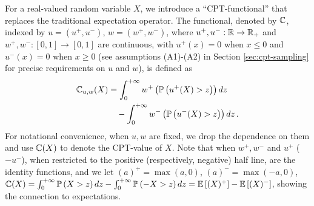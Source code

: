 
For a real-valued random variable $X$, we introduce a ``CPT-functional'' that replaces the traditional expectation operator. 
The functional, denoted by $\mathbb{C}$,
indexed by
$u=(u^+,u^-)$, $w=(w^+,w^-)$, where $u^+,u^-:\mathbb{R}\rightarrow \mathbb{R}_+$ and $w^+,w^-:[0,1] \rightarrow [0,1]$ are continuous,
with $u^+(x)=0$ when $x\le 0$ and $u^-(x)=0$ when $x\ge 0$ (see assumptions (A1)-(A2) in Section \ref{sec:cpt-sampling} for precise requirements on $u$ and $w$),
 is defined as 
\begin{align}
\mathbb{C}_{u,w}(X) &= \int_0^{+\infty} w^+\left(\mathbb{P}\left( u^+(X)>z \right)\right) dz\nonumber \\
&\quad - \int_0^{+\infty} w^-\left(\mathbb{P}\left( u^-(X)>z \right)\right) dz\,. \label{eq:cpt-general}
\end{align}
For notational convenience, when $u,w$ are fixed, we drop the dependence on them and use $\mathbb{C}(X)$ to denote the CPT-value of $X$. Note that when $w^+,w^-$
and $u^+$ ($-u^-$), when restricted to the positive (respectively, negative) half line, 
are the identity functions, and we let $(a)^+ = \max(a,0)$, $(a)^- = \max(-a,0)$,
$\mathbb{C}(X) = \int_0^{+\infty} \mathbb{P}\left( X>z \right) dz -  \int_0^{+\infty} \mathbb{P}\left( -X>z \right) dz = \mathbb{E}\left[ (X)^+ \right] - \mathbb{E}\left[ (X)^- \right]$, showing the connection to expectations.

